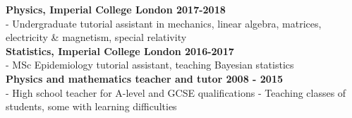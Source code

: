 \noindent \textbf{Physics, Imperial College London \hfill 2017-2018}\\
\noindent - Undergraduate tutorial assistant in mechanics, linear algebra, matrices, electricity \& magnetism, special relativity\\

\noindent \textbf{Statistics, Imperial College London \hfill 2016-2017}\\
- MSc Epidemiology tutorial assistant, teaching Bayesian statistics\\

\noindent \textbf{Physics and mathematics teacher and tutor \hfill 2008 - 2015}\\
- High school teacher for A-level and GCSE qualifications
- Teaching classes of students, some with learning difficulties	

